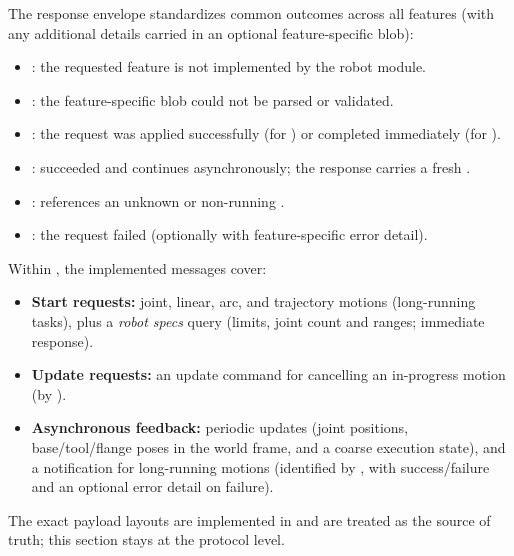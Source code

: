 The response envelope standardizes common outcomes across all features (with any additional details carried in an optional feature-specific blob):
\begin{itemize}
    \item {}: the requested feature is not implemented by the robot module.
    \item {}: the feature-specific blob could not be parsed or validated.
    \item {}: the request was applied successfully (for ) or completed immediately (for ).
    \item {}:  succeeded and continues asynchronously; the response carries a fresh .
    \item {}:  references an unknown or non-running .
    \item {}: the request failed (optionally with feature-specific error detail).
\end{itemize}

Within , the implemented messages cover:
\begin{itemize}
    \item \textbf{Start requests:} joint, linear, arc, and trajectory motions (long-running tasks), plus a \emph{robot specs} query (limits, joint count and ranges; immediate response).
    \item \textbf{Update requests:} an update command for cancelling an in-progress motion (by ).
    \item \textbf{Asynchronous feedback:} periodic  updates (joint positions, base/tool/flange poses in the world frame, and a coarse execution state), and a  notification for long-running motions (identified by , with success/failure and an optional error detail on failure).
\end{itemize}
The exact payload layouts are implemented in  and are treated as the source of truth; this section stays at the protocol level.


